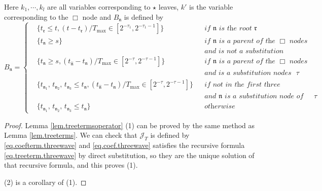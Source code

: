 \begin{lem}
\begin{equation}
\end{equation}
Here $k_1,\cdots,k_{l}$ are all variables corresponding to $\star$ leaves, $k'$ is the variable corresponding to the $\Box$ node and $B_{\mathfrak{n}}$ is defined by 
\begin{equation}
    B_{\mathfrak{n}}=\left\{
    \begin{aligned}
        &\{t_{\mathfrak{r}}\le t, (t-t_{\mathfrak{r}})/T_{\text{max}}\in [2^{-\tau_{1}},2^{-\tau_{1}-1}]\} && \textit{if $\mathfrak{n}$ is the root $\mathfrak{r}$ }
        \\
        &\{t_{\mathfrak{n}}\ge s\} && \textit{if $\mathfrak{n}$ is a parent of the $\Box$ nodes}
        \\
        &\  &&\textit{and is not a substitution nodes}
        \\
        &\{t_{\mathfrak{n}}\ge s, (t_{\widehat{\mathfrak{n}}}-t_{\mathfrak{n}})/T_{\text{max}}\in [2^{-\tau},2^{-\tau-1}]\} && \textit{if $\mathfrak{n}$ is a parent of the $\Box$ nodes}
        \\
        &\  &&\textit{and is a substitution nodes of index $\tau$}
        \\
        &\{t_{\mathfrak{n}_1},\, t_{\mathfrak{n}_2},\, t_{\mathfrak{n}_3}\le t_{\mathfrak{n}}, (t_{\widehat{\mathfrak{n}}}-t_{\mathfrak{n}})/T_{\text{max}}\in [2^{-\tau},2^{-\tau-1}]\}  &&\textit{if not in the first three cases}
        \\
        &\  &&\textit{and $\mathfrak{n}$ is a substitution node of index $\tau$}
        \\
        &\{t_{\mathfrak{n}_1},\, t_{\mathfrak{n}_2},\, t_{\mathfrak{n}_3}\le t_{\mathfrak{n}}\} && \textit{otherwise}
    \end{aligned}\right.
\end{equation}
\end{lem}
\begin{proof}
Lemma \ref{lem.treetermsoperator} (1) can be proved by the same method as Lemma \ref{lem.treeterms}. We can check that $\mathcal{J}_T$ is defined by \eqref{eq.coefterm.threewave} and \eqref{eq.coef.threewave} satisfies the recursive formula \eqref{eq.treeterm.threewave} by direct substitution, so they are the unique solution of that recursive formula, and this proves (1).

(2) is a corollary of (1).
\end{proof}


